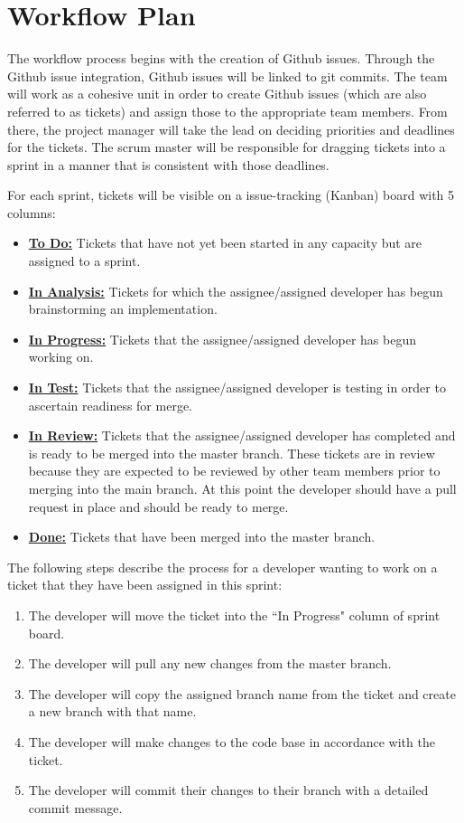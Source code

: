 \documentclass{article}
\begin{document}
\section{Workflow Plan}

The workflow process begins with the creation of Github issues. Through the Github issue integration, Github issues will be linked to git commits.
The team will work as a cohesive unit in order to create 
Github issues (which are also referred to as tickets) and assign those to the appropriate team members. 
From there, the project manager will take the lead on deciding priorities and deadlines for the tickets. 
The scrum master will be responsible for dragging tickets into a sprint in a manner that is consistent with those deadlines.

For each sprint, tickets will be visible on a issue-tracking (Kanban) board with 5 columns:

\begin{itemize}
	\item \textbf{\underline{To Do:}} Tickets that have not yet been started in any capacity but are assigned to a sprint.
	\item \textbf{\underline{In Analysis:}} Tickets for which the assignee/assigned developer has begun brainstorming an implementation. 
	\item \textbf{\underline{In Progress:}} Tickets that the assignee/assigned developer has begun working on.
	\item \textbf{\underline{In Test:}} Tickets that the assignee/assigned developer is testing in order to ascertain readiness for merge.
	\item \textbf{\underline{In Review:}} Tickets that the assignee/assigned developer has completed and is ready to be merged into the master branch.
	These tickets are in review because they are expected to be reviewed by other team members prior to merging into the main branch. 
	At this point the developer should have a pull request in place and should be ready to merge.
	\item \textbf{\underline{Done:}} Tickets that have been merged into the master branch. 
\end{itemize} 


The following steps describe the process for a developer wanting to work on a ticket that they have been assigned in this sprint:
\begin{enumerate}
	\item The developer will move the ticket into the ``In Progress" column of sprint board.
	\item The developer will pull any new changes from the master branch. 
	\item The developer will copy the assigned branch name from the ticket and create a new branch with that name.
	\item The developer will make changes to the code base in accordance with the ticket.
	\item The developer will commit their changes to their branch with a detailed commit message. 
\end{enumerate}
\end{document}

